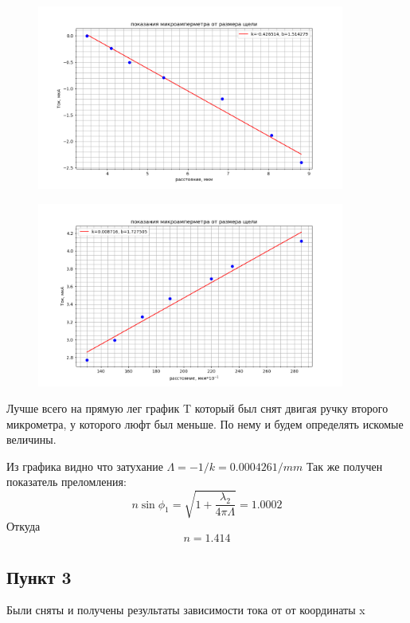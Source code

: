 \documentclass[a4paper, 12pt]{article}
\begin{document}
\begin{figure}[h!]
    \includegraphics[width=0.9\textwidth]{data/data3.png}
\end{figure}

\newpage 

\begin{figure}[h!]
    \includegraphics[width=0.9\textwidth]{data/data4.png}
\end{figure}


Лучше всего на прямую лег график T который был снят двигая ручку второго микрометра, у которого люфт был меньше. По нему и будем определять искомые величины.

Из графика видно что затухание $\Lambda = -1/k = 0.000426 1/mm$
Так же получен показатель преломления: 
\[n\sin \phi_1 = \sqrt{1 + \frac{\lambda_2}{4 \pi \Lambda}} = 1.0002\]
Откуда
\[n = 1.414\]

\newpage 
\subsection{Пункт 3}
Были сняты и получены результаты зависимости тока от от координаты x
\end{document}

